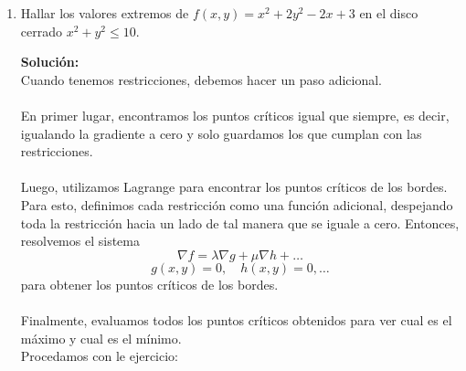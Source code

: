 \documentclass[12pt]{article}
\newenvironment{solucion}
{\begin{mdframed}[backgroundcolor=black!10]
		{\bf Solución:}\\
	}
	{
	\end{mdframed}
}
\newenvironment{preguntas}
{\begin{enumerate}\itemsep12pt
	}
	{
	\end{enumerate}
}
\begin{document}
\begin{preguntas}
\item Hallar los valores extremos de $f(x,y) = x^2+2y^2-2x+3$ en el disco cerrado $x^2+y^2 \leq 10$.
\begin{solucion}
Cuando tenemos restricciones, debemos hacer un paso adicional. \\
\\
En primer lugar, encontramos los puntos críticos igual que siempre, es decir, igualando la gradiente a cero y solo guardamos los que cumplan con las restricciones. \\
\\
Luego, utilizamos Lagrange para encontrar los puntos críticos de los bordes. Para esto, definimos cada restricción como una función adicional, despejando toda la restricción hacia un lado de tal manera que se iguale a cero. Entonces, resolvemos el sistema
$$\nabla f = \lambda \nabla g + \mu \nabla h + \dots$$
$$g(x,y) = 0, \quad h(x,y) = 0, \dots$$
para obtener los puntos críticos de los bordes.\\
\\
Finalmente, evaluamos todos los puntos críticos obtenidos para ver cual es el máximo y cual es el mínimo.\\

Procedamos con le ejercicio:\\


\end{solucion}
\end{preguntas}
\end{document}
